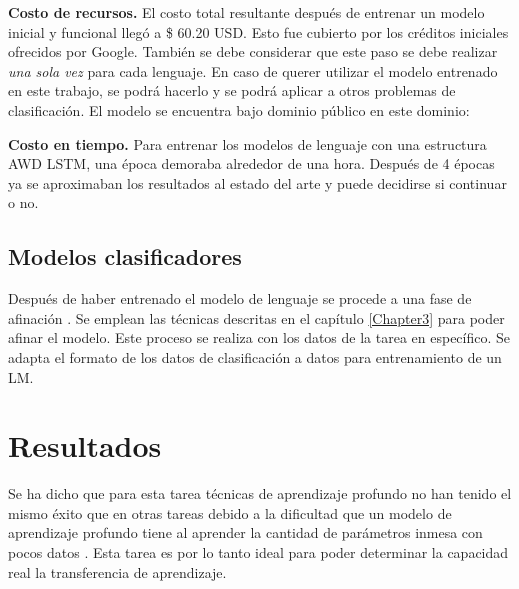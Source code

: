 \textbf{Costo de recursos.} El costo total resultante después de entrenar un modelo inicial y funcional llegó a \$ 60.20 USD. Esto fue cubierto por los créditos iniciales ofrecidos por Google. También se debe considerar que este paso se debe realizar \emph{una sola vez} para cada lenguaje. En caso de querer utilizar el modelo entrenado en este trabajo, se podrá hacerlo y se podrá aplicar a otros problemas de clasificación. El modelo se encuentra bajo dominio público en este dominio:

\textbf{Costo en tiempo.} Para entrenar los modelos de lenguaje con una estructura AWD LSTM, una época demoraba alrededor de una hora. Después de 4 épocas ya se aproximaban los resultados al estado del arte y puede decidirse si continuar o no.

\subsection{Modelos clasificadores}

Después de haber entrenado el modelo de lenguaje se procede a una fase de afinación \parencite{howard2018}. Se emplean las técnicas descritas en el capítulo \ref{Chapter3} para poder afinar el modelo. Este proceso se realiza con los datos de la tarea en específico. Se adapta el formato de los datos de clasificación a datos para entrenamiento de un LM.


\section{Resultados}

Se ha dicho que para esta tarea técnicas de aprendizaje profundo no han tenido el mismo éxito que en otras tareas debido a la dificultad que un modelo de aprendizaje profundo tiene al aprender la cantidad de parámetros inmesa con pocos datos \parencite{zampieri2017, malmasi2016discriminating}. Esta tarea es por lo tanto ideal para poder determinar la capacidad real la transferencia de aprendizaje.






